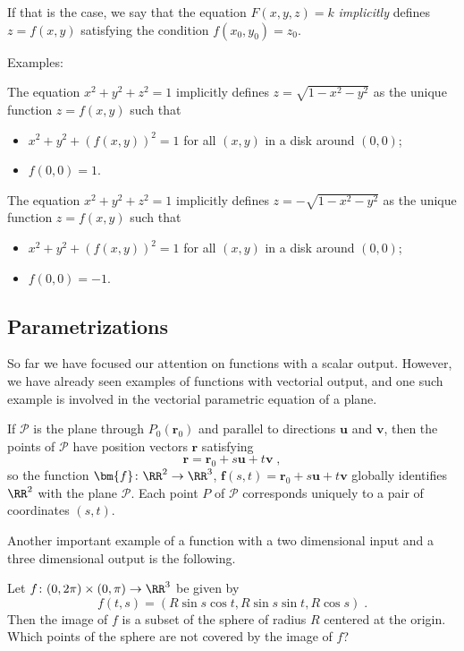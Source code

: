 If that is the case, we say that the equation $F(x,y,z) = k$ \emph{implicitly} defines $z=f(x,y)$ satisfying the condition $f(x_0,y_0) = z_0$.

Examples:

The equation $x^2+y^2+z^2 = 1$ implicitly defines $z=\sqrt{1-x^2-y^2}$ as the unique function $z=f(x,y)$ such that
%
\begin{itemize}
  \item $x^2+ y^2+(f(x,y))^2 = 1$ for all $(x,y)$ in a disk around $(0,0)$;
  \item $f(0,0) = 1$.
\end{itemize}

The equation $x^2+y^2+z^2 = 1$ implicitly defines $z=-\sqrt{1-x^2-y^2}$ as the unique function $z=f(x,y)$ such that
%
\begin{itemize}
  \item $x^2+ y^2+(f(x,y))^2 = 1$ for all $(x,y)$ in a disk around $(0,0)$;
  \item $f(0,0) = -1$.
\end{itemize}

\subsection{Parametrizations}
So far we have focused our attention on functions with
a scalar output. However, we have already seen examples of
functions with vectorial output, and one such example is
involved in the vectorial parametric equation of a plane.

If $\mathcal{P}$ is the plane through
$P_0(\textbf{r}_0)$ and parallel to directions
$\textbf{u}$ and $\textbf{v}$, then the points
of $\mathcal{P}$ have position vectors $\textbf{r}$
satisfying
%
$$\textbf{r} = \textbf{r}_0 + s \textbf{u} +
t \textbf{v}\; ,$$
%
so the function $\bm{f} \colon \RR^2 \to \RR^3$,
$\bm{f}(s,t) = \textbf{r}_0 +
s \textbf{u} + t \textbf{v}$ globally identifies
$\RR^2$ with the plane $\mathcal{P}$.
Each point $P$ of $\mathcal{P}$ corresponds
uniquely to a pair of coordinates $(s,t)$.

Another important example of a function with a
two dimensional input and a three dimensional output is
the following.

\begin{exmp}{\rm Let $f \colon (0,2\pi)
\times (0,\pi) \to \RR^3$ be given by
%
$$f(t,s) = (R\sin{s}\cos{t}, R\sin{s}\sin{t},
R\cos{s}) \; .$$
%
Then the image of $f$ is a subset of the
sphere of radius $R$ centered at the origin.
Which points of the sphere are not covered
by the image of $f$?
}\end{exmp}


